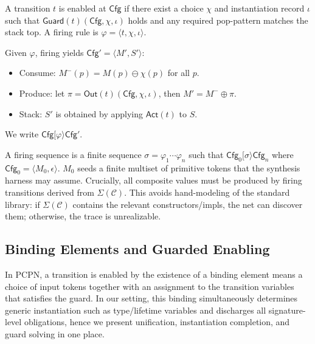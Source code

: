 \documentclass[runningheads]{llncs}
\begin{document}
\begin{definition} 
\label{def:pcpn:firing}
A transition $t$ is enabled at $\mathsf{Cfg}$ if there exist a choice $\chi$ and instantiation record $\iota$ such that $\mathsf{Guard}(t)(\mathsf{Cfg},\chi,\iota)$ holds and any required pop-pattern matches the stack top. A firing rule is $\varphi=\langle t,\chi,\iota\rangle$.

Given $\varphi$, firing yields $\mathsf{Cfg}'=\langle M',S'\rangle$:
\begin{itemize}
\item Consume: $M^{-}(p)=M(p)\ominus \chi(p)$ for all $p$.
\item Produce: let $\pi=\mathsf{Out}(t)(\mathsf{Cfg},\chi,\iota)$, then $M'=M^{-}\oplus \pi$.
\item Stack: $S'$ is obtained by applying $\mathsf{Act}(t)$ to $S$.
\end{itemize}
We write $\mathsf{Cfg}[\varphi\rangle \mathsf{Cfg}'$. 
\end{definition}
A firing sequence is a finite sequence $\sigma=\varphi_1\cdots\varphi_n$ such that
$\mathsf{Cfg}_0[\sigma\rangle \mathsf{Cfg}_n$ where $\mathsf{Cfg}_0=\langle M_0,\epsilon\rangle$.
$M_0$ seeds a finite multiset of primitive tokens that the synthesis harness may assume. Crucially, all composite values must be produced by firing transitions derived from $\Sigma(\mathcal{C})$. This avoids hand-modeling of the standard library: if $\Sigma(\mathcal{C})$ contains the relevant constructors/impls, the net can discover them; otherwise, the trace is unrealizable.

\subsection{Binding Elements and Guarded Enabling}
\label{sec:method:binding}
In PCPN, a transition is enabled by the existence of a binding element means a choice of input tokens together with an assignment to the transition variables that satisfies the guard. In our setting, this binding simultaneously determines generic instantiation such as type/lifetime variables and discharges all signature-level obligations, hence we present unification, instantiation completion, and guard solving in one place.
\end{document}
